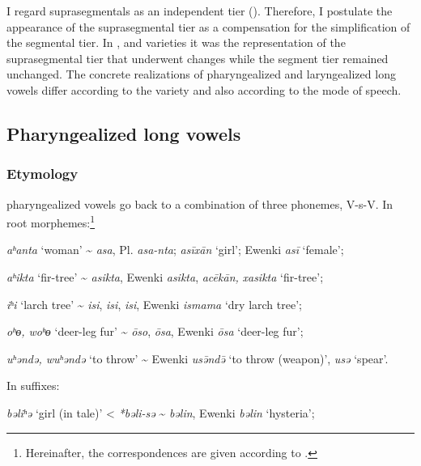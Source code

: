 \documentclass[output=paper,colorlinks,citecolor=brown]{langscibook}
\begin{document}
I regard suprasegmentals as an independent tier (\citealt{Goldsmith1976}). Therefore, I postulate the appearance of the suprasegmental tier as a compensation for the simplification of the segmental tier. In ,  and  varieties it was the representation of the suprasegmental tier that underwent changes while the segment tier remained unchanged. The concrete realizations of pharyngealized and laryngealized long vowels differ according to the variety and also according to the mode of speech.


\subsection{Pharyngealized long vowels}

\subsubsection{Etymology}

 pharyngealized vowels go back to a combination of three phonemes, V-s-V. In root morphemes:\footnote{Hereinafter, the correspondences are given according to \citet{Cincius1975P}.}

\ea
    \label{example7.3}
 \textit{aʰanta} ‘woman’ {\textasciitilde}  \textit{asa}, Pl. \textit{asa-nta};  \textit{asīxān} ‘girl’; Ewenki \textit{asī} ‘female’;
\z

\ea
    \label{example7.4}
 \textit{aʰikta} ‘fir-tree’ {\textasciitilde}  \textit{asikta}, Ewenki \textit{asikta}, \textit{acēkān,}  \textit{xasikta} ‘fir-tree’;
\z

\ea
    \label{example7.5}
 \textit{iʰi} ‘larch tree’ {\textasciitilde}  \textit{isi},  \textit{isi},  \textit{isi}, Ewenki \textit{ismama} ‘dry larch tree’;
\z

\ea
    \label{example7.6}
 \textit{oʰɵ, woʰɵ} ‘deer-leg fur’ {\textasciitilde}  \textit{ōso},  \textit{ōsa}, Ewenki \textit{ōsa} ‘deer-leg fur’;
\z

\ea
    \label{example7.7}
 \textit{uʰəndə, wuʰəndə} ‘to throw’ {\textasciitilde} Ewenki \textit{us\={ə}nd\={ə}} ‘to throw (weapon)',  \textit{us{ə}} ‘spear’.
\z

\noindent In suffixes:

\ea
    \label{example7.8}
 \textit{b{ə}liʰ{ə}} ‘girl (in tale)’ < \textit{*b{ə}li-s{ə}} {\textasciitilde}  \textit{b{ə}lin}, Ewenki \textit{b{ə}lin} ‘hysteria’;
\z
\end{document}
